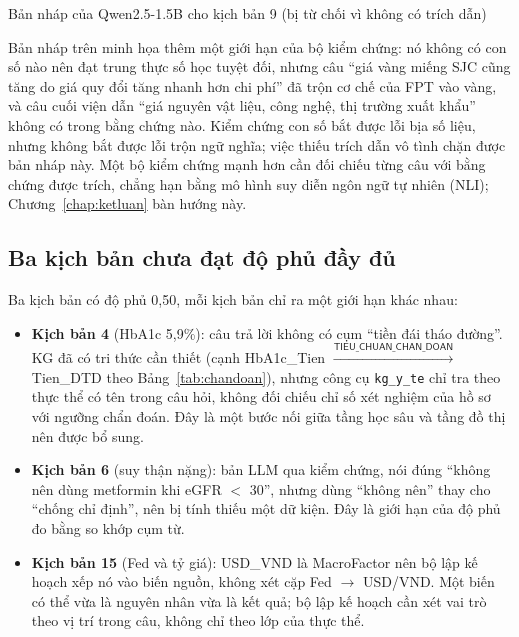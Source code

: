 \begin{vetsuyluan}{Bản nháp của Qwen2.5-1.5B cho kịch bản 9 (bị từ chối vì không có trích dẫn)}

\end{vetsuyluan}

Bản nháp trên minh họa thêm một giới hạn của bộ kiểm chứng: nó không có con số nào nên đạt trung thực số học tuyệt
đối, nhưng câu ``giá vàng miếng SJC cũng tăng do giá quy đổi tăng nhanh hơn chi phí'' đã trộn cơ chế của FPT vào vàng,
và câu cuối viện dẫn ``giá nguyên vật liệu, công nghệ, thị trường xuất khẩu'' không có trong bằng chứng nào. Kiểm
chứng con số bắt được lỗi bịa số liệu, nhưng không bắt được lỗi trộn ngữ nghĩa; việc thiếu trích dẫn vô tình chặn
được bản nháp này. Một bộ kiểm chứng mạnh hơn cần đối chiếu từng câu với bằng chứng được trích, chẳng hạn bằng mô
hình suy diễn ngôn ngữ tự nhiên (NLI); Chương~\ref{chap:ketluan} bàn hướng này.

\subsection{Ba kịch bản chưa đạt độ phủ đầy đủ}
Ba kịch bản có độ phủ 0,50, mỗi kịch bản chỉ ra một giới hạn khác nhau:

\begin{itemize}
  \item \textbf{Kịch bản 4} (HbA1c 5,9\%): câu trả lời không có cụm ``tiền đái tháo đường''. KG đã có tri thức cần
        thiết (cạnh \textsf{HbA1c\_Tien} $\xrightarrow{\textsf{TIEU\_CHUAN\_CHAN\_DOAN}}$ \textsf{Tien\_DTD} theo
        Bảng~\ref{tab:chandoan}), nhưng công cụ \texttt{kg\_y\_te} chỉ tra theo thực thể có tên trong câu hỏi, không
        đối chiếu chỉ số xét nghiệm của hồ sơ với ngưỡng chẩn đoán. Đây là một bước nối giữa tầng học sâu và tầng đồ
        thị nên được bổ sung.
  \item \textbf{Kịch bản 6} (suy thận nặng): bản LLM qua kiểm chứng, nói đúng ``không nên dùng metformin khi eGFR
        $<$ 30'', nhưng dùng ``không nên'' thay cho ``chống chỉ định'', nên bị tính thiếu một dữ kiện. Đây là giới hạn
        của độ phủ đo bằng so khớp cụm từ.
  \item \textbf{Kịch bản 15} (Fed và tỷ giá): \textsf{USD\_VND} là \textsf{MacroFactor} nên bộ lập kế hoạch xếp nó vào
        biến nguồn, không xét cặp Fed $\to$ USD/VND. Một biến có thể vừa là nguyên nhân vừa là kết quả; bộ lập kế
        hoạch cần xét vai trò theo vị trí trong câu, không chỉ theo lớp của thực thể.
\end{itemize}

